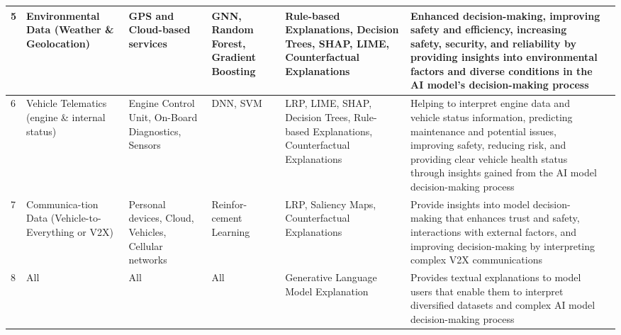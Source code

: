 \documentclass[final,5p,times,twocolumn]{elsarticle}
\begin{document}
\begin{table}[!h]
\begin{center}
\begin{tabular}{m{10pt}|m{55pt}|m{40pt}|m{40pt}|m{65pt}|m{170pt}|m{25pt}}
        5 & Environmental Data (Weather \& Geolocation) & GPS and Cloud-based services & GNN, Random Forest, Gradient Boosting & Rule-based Explanations, Decision Trees, SHAP, LIME, Counterfactual Explanations & Enhanced decision-making, improving safety and efficiency, increasing safety, security, and reliability by providing insights into environmental factors and diverse conditions in the AI model’s decision-making process & \cite{atakishiyev2021explainable,nwakanma2023explainable} \\ \hline 
        
        6 & Vehicle Telematics (engine \& internal status) & Engine Control Unit, On-Board Diagnostics, Sensors & DNN, SVM & LRP, LIME, SHAP, Decision Trees, Rule-based Explanations, Counterfactual Explanations & Helping to interpret engine data and vehicle status information, predicting maintenance and potential issues, improving safety, reducing risk, and providing clear vehicle health status through insights gained from the AI model decision-making process  & \cite{li2023intelligent} \\ \hline 
        
        7 & Communica-\newline tion Data (Vehicle-to-Everything or V2X) & Personal devices, Cloud, Vehicles, Cellular networks & Reinfor-\newline cement Learning & LRP, Saliency Maps, Counterfactual Explanations & Provide insights into model decision-making that enhances trust and safety, interactions with external factors, and improving decision-making by interpreting complex V2X communications  & \cite{bendiab2023autonomous} \\ \hline 
        8 & All & All & All & Generative Language Model Explanation & Provides textual explanations to model users that enable them to interpret  diversified datasets and complex AI model decision-making process & \cite{dong2023did} \\ \hline

\end{tabular}
\end{center}  
\end{table}
\end{document}

